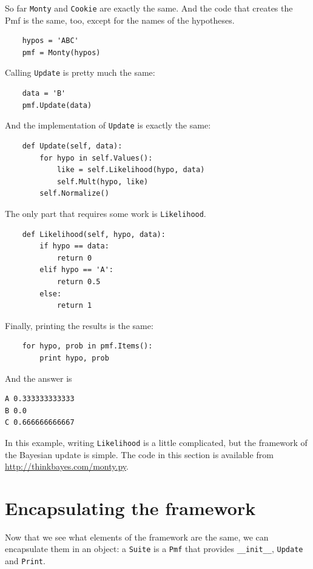 \documentclass[12pt]{book}
\begin{document}
So far \verb"Monty" and \verb"Cookie" are exactly the same.
And the code that creates the Pmf is the same, too, except for
the names of the hypotheses.

\begin{verbatim}
    hypos = 'ABC'
    pmf = Monty(hypos)
\end{verbatim}

Calling \verb"Update" is pretty much the same:

\begin{verbatim}
    data = 'B'
    pmf.Update(data)
\end{verbatim}

And the implementation of \verb"Update" is exactly the same:

\begin{verbatim}
    def Update(self, data):
        for hypo in self.Values():
            like = self.Likelihood(hypo, data)
            self.Mult(hypo, like)
        self.Normalize()
\end{verbatim}

The only part that requires some work is \verb"Likelihood".

\begin{verbatim}
    def Likelihood(self, hypo, data):
        if hypo == data:
            return 0
        elif hypo == 'A':
            return 0.5
        else:
            return 1
\end{verbatim}

Finally, printing the results is the same:

\begin{verbatim}
    for hypo, prob in pmf.Items():
        print hypo, prob
\end{verbatim}

And the answer is

\begin{verbatim}
A 0.333333333333
B 0.0
C 0.666666666667
\end{verbatim}

In this example, writing \verb"Likelihood" is a little complicated,
but the framework of the Bayesian update is simple.  The code in
this section is available from \url{http://thinkbayes.com/monty.py}.


\section{Encapsulating the framework}

Now that we see what elements of the framework are the same, we
can encapsulate them in an object: a \verb"Suite" is a \verb"Pmf"
that provides \verb"__init__", \verb"Update" and \verb"Print".
\end{document}
